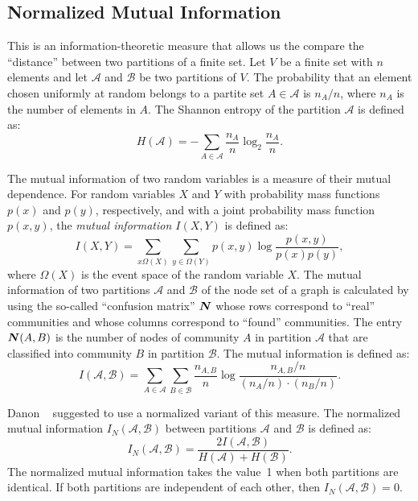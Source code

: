 \subsection{Normalized Mutual Information}
This is an information-theoretic measure that allows us the 
compare the ``distance'' between two partitions of a finite set. Let $V$ be a finite set 
with $n$ elements and let $\mathcal{A}$ and $\mathcal{B}$ be two partitions of $V$. The probability that an 
element chosen uniformly at random belongs to a partite set $A \in \mathcal{A}$ is $n_A/n$, where $n_A$ 
is the number of elements in $A$. The Shannon entropy of the partition $\mathcal{A}$ 
is defined as:
\begin{equation}\label{eqn:shannon_entropy}
H(\mathcal{A}) = - \sum_{A \in \mathcal{A}} \frac{n_A}{n} \log_2 \frac{n_A}{n}.
\end{equation}

The mutual information of two random variables is a measure of their mutual dependence. For random 
variables $X$ and $Y$ with probability mass functions $p(x)$ and $p(y)$, respectively, and 
with a joint probability mass function $p(x, y)$, the \emph{mutual information $I(X, Y)$} 
is defined as:
\begin{equation}\label{eqn:mutual_information_rv}
I(X, Y) = \sum_{x \Omega(X)} \sum_{y \in \Omega(Y)} p(x, y) \log \frac{p(x, y)}{p(x) p(y)},
\end{equation}
where $\Omega(X)$ is the event space of the random variable $X$.
The mutual information of two partitions $\mathcal{A}$ and $\mathcal{B}$ 
of the node set of a graph is calculated by using the so-called ``confusion matrix'' 
$\boldsymbol{N}$ whose rows correspond to ``real'' communities and whose columns correspond 
to ``found'' communities. The entry $\boldsymbol{N}(A, B)$ is the number of nodes of community 
$A$ in partition $\mathcal{A}$ that are classified into community $B$ in partition $\mathcal{B}$. 
The mutual information is defined as:
\begin{equation}\label{eqn:mutual_information_graphs}
I(\mathcal{A}, \mathcal{B}) = 
	\sum_{A \in \mathcal{A}} \sum_{B \in \mathcal{B}} \frac{n_{A, B}}{n} 
		\log \frac{n_{A, B} / n}{ (n_A / n) \cdot (n_B / n) }.  
\end{equation}

Danon \etal~\cite{DDDA05} suggested to use a normalized variant of this measure. The 
normalized mutual information $I_N(\mathcal{A}, \mathcal{B})$ between partitions 
$\mathcal{A}$ and $\mathcal{B}$ is defined as:
\begin{equation} \label{eqn:normalized_mutual_information}
I_N(\mathcal{A}, \mathcal{B}) =  \frac{2 I(\mathcal{A}, \mathcal{B})}{H(\mathcal{A}) + H(\mathcal{B})}.
\end{equation}
The normalized mutual information takes the value~1 when both partitions are identical. If both partitions 
are independent of each other, then $I_N(\mathcal{A}, \mathcal{B}) = 0$. 

